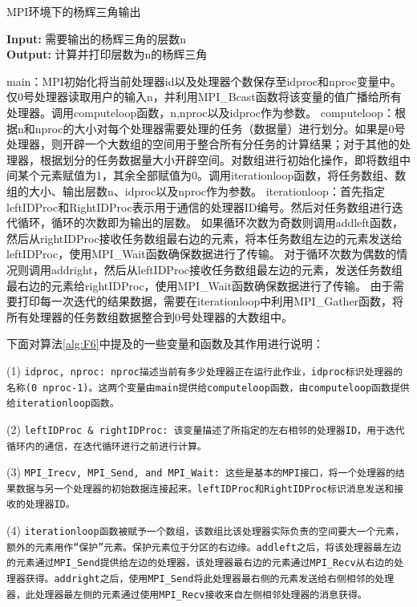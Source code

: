\documentclass[supercite]{Experimental_Report}
\theoremstyle{definition}
\begin{document}
\begin{algorithm}[htb]
\caption{MPI环境下的杨辉三角输出}
\label{alg:F6}
\hspace*{0.02in} {\bf Input:}
需要输出的杨辉三角的层数n\\
\hspace*{0.02in} {\bf Output:} 
计算并打印层数为n的杨辉三角
  \begin{algorithmic}[1]
    \State
        main：MPI初始化将当前处理器id以及处理器个数保存至idproc和nproc变量中。仅0号处理器读取用户的输入n，并利用MPI\_Bcast函数将该变量的值广播给所有处理器。调用computeloop函数，n,nproc以及idproc作为参数。
    \State
        computeloop：根据n和nproc的大小对每个处理器需要处理的任务（数据量）进行划分。如果是0号处理器，则开辟一个大数组的空间用于整合所有分任务的计算结果；对于其他的处理器，根据划分的任务数据量大小开辟空间。对数组进行初始化操作，即将数组中间某个元素赋值为1，其余全部赋值为0。调用iterationloop函数，将任务数组、数组的大小、输出层数n、idproc以及nproc作为参数。
    \State
        iterationloop：首先指定leftIDProc和RightIDProc表示用于通信的处理器ID编号。然后对任务数组进行迭代循环，循环的次数即为输出的层数。
    \State
        如果循环次数为奇数则调用addleft函数，然后从rightIDProc接收任务数组最右边的元素，将本任务数组左边的元素发送给leftIDProc，使用MPI\_Wait函数确保数据进行了传输。
    \State
        对于循环次数为偶数的情况则调用addright，然后从leftIDProc接收任务数组最左边的元素，发送任务数组最右边的元素给rightIDProc，使用MPI\_Wait函数确保数据进行了传输。
    \State
        由于需要打印每一次迭代的结果数据，需要在iterationloop中利用MPI\_Gather函数，将所有处理器的任务数组数据整合到0号处理器的大数组中。
  \end{algorithmic}
\end{algorithm}

下面对算法\ref{alg:F6}中提及的一些变量和函数及其作用进行说明：

(1) \texttt{idproc, nproc: nproc描述当前有多少处理器正在运行此作业，idproc标识处理器的名称(0~nproc-1)。这两个变量由main提供给computeloop函数，由computeloop函数提供给iterationloop函数。}

(2) \texttt{leftIDProc \& rightIDProc: 该变量描述了所指定的左右相邻的处理器ID，用于迭代循环内的通信，在迭代循环进行之前进行计算。}

(3) \texttt{MPI\_Irecv, MPI\_Send, and MPI\_Wait: 这些是基本的MPI接口，将一个处理器的结果数据与另一个处理器的初始数据连接起来。leftIDProc和RightIDProc标识消息发送和接收的处理器ID。}

(4) \texttt{iterationloop函数被赋予一个数组，该数组比该处理器实际负责的空间要大一个元素，额外的元素用作“保护”元素。保护元素位于分区的右边缘。addleft之后，将该处理器最左边的元素通过MPI\_Send提供给左边的处理器，该处理器最右边的元素通过MPI\_Recv从右边的处理器获得。addright之后，使用MPI\_Send将此处理器最右侧的元素发送给右侧相邻的处理器，此处理器最左侧的元素通过使用MPI\_Recv接收来自左侧相邻处理器的消息获得。}
\end{document}
